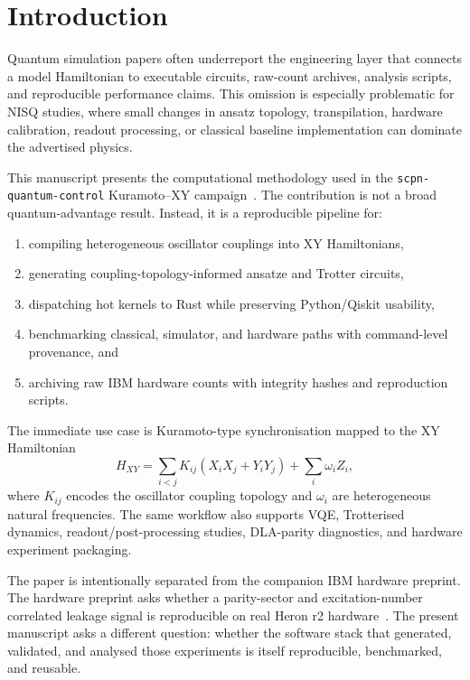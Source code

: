 \documentclass[preprint,aps,physrev,superscriptaddress,floatfix,longbibliography]{revtex4-2}
\begin{document}
\section{Introduction}

Quantum simulation papers often underreport the engineering layer that
connects a model Hamiltonian to executable circuits, raw-count archives,
analysis scripts, and reproducible performance claims. This omission is
especially problematic for NISQ studies, where small changes in ansatz
topology, transpilation, hardware calibration, readout processing, or
classical baseline implementation can dominate the advertised physics.

This manuscript presents the computational methodology used in the
\texttt{scpn-quantum-control} Kuramoto--XY campaign~\cite{SotekSCPNSoftware}.
The contribution is
not a broad quantum-advantage result. Instead, it is a reproducible
pipeline for:
%
\begin{enumerate}
  \item compiling heterogeneous oscillator couplings into XY Hamiltonians,
  \item generating coupling-topology-informed ansatze and Trotter circuits,
  \item dispatching hot kernels to Rust while preserving Python/Qiskit
        usability,
  \item benchmarking classical, simulator, and hardware paths with
        command-level provenance, and
  \item archiving raw IBM hardware counts with integrity hashes and
        reproduction scripts.
\end{enumerate}

The immediate use case is Kuramoto-type synchronisation mapped to the
XY Hamiltonian
%
\begin{equation}
  H_{XY} =
  \sum_{i<j} K_{ij}\left(X_i X_j + Y_i Y_j\right)
  + \sum_i \omega_i Z_i,
\end{equation}
%
where $K_{ij}$ encodes the oscillator coupling topology and $\omega_i$
are heterogeneous natural frequencies. The same workflow also supports
VQE, Trotterised dynamics, readout/post-processing studies, DLA-parity
diagnostics, and hardware experiment packaging.

The paper is intentionally separated from the companion IBM hardware
preprint. The hardware preprint asks whether a parity-sector and
excitation-number correlated leakage signal is reproducible on real Heron
r2 hardware~\cite{SotekDLA2026,SotekDLAData2026}. The present manuscript asks a different question: whether
the software stack that generated, validated, and analysed those
experiments is itself reproducible, benchmarked, and reusable.
\end{document}
